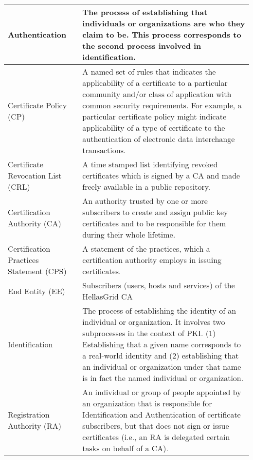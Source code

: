 \begin{tabular}{|p{}|p{}|}

\hline
Authentication & 
The process of establishing that individuals or organizations are who they claim to be. This process corresponds to the second process involved in identification. \\
\hline
Certificate Policy (CP) &
A named set of rules that indicates the applicability of a certificate to a particular community and/or class of application with common security requirements. For example, a particular certificate policy might indicate applicability of a type of certificate to the authentication of electronic data interchange transactions. \\
\hline
Certificate Revocation List (CRL) &
A time stamped list identifying revoked certificates which is signed by a CA and made freely available in a public repository. \\
\hline
Certification Authority (CA) &
An authority trusted by one or more subscribers to create and assign public key certificates and to be responsible for them during their whole lifetime. \\
\hline
Certification Practices Statement (CPS) &
A statement of the practices, which a certification authority employs in issuing certificates. \\
\hline
End Entity (EE) & 
Subscribers (users, hosts and services) of the HellasGrid CA \\
\hline
Identification & 
The process of establishing the identity of an individual or organization. It involves two subprocesses in the context of PKI. (1) Establishing that a given name corresponds to a real-world identity and (2) establishing that an individual or organization under that name is in fact the named individual or organization. \\
\hline
Registration Authority (RA) & 
An individual or group of people appointed by an organization that is responsible for Identification and Authentication of certificate subscribers, but that does not sign or issue certificates (i.e., an RA is delegated certain tasks on behalf of a CA).\\

\end{tabular}
